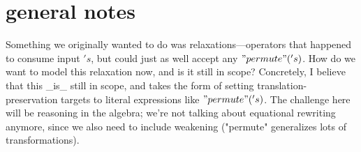 \documentclass{article}
\begin{document}
\section{general notes}

Something we originally wanted to do was relaxations---operators that happened to consume input $'s$, but could just as well accept any $"permute"('s)$.  How do we want to model this relaxation now, and is it still in scope? Concretely, I believe that this _is_ still in scope, and takes the form of setting translation-preservation targets to literal expressions like $"permute"('s)$.  The challenge here will be reasoning in the algebra; we're not talking about equational rewriting anymore, since we also need to include weakening ("permute" generalizes lots of transformations). 
\end{document}
